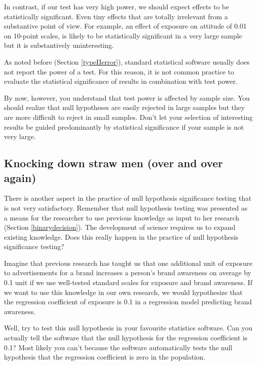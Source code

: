 \documentclass[a4paper]{book}
\theoremstyle{definition}
\theoremstyle{definition}
\theoremstyle{definition}
\theoremstyle{remark}
\begin{document}
In contrast, if our test has very high power, we should expect effects
to be statistically significant. Even tiny effects that are totally
irrelevant from a substantive point of view. For example, an effect of
exposure on attitude of 0.01 on 10-point scales, is likely to be
statistically significant in a very large sample but it is substantively
uninteresting.

As noted before (Section \ref{typeIIerror}), standard statistical
software usually does not report the power of a test. For this reason,
it is not common practice to evaluate the statistical significance of
results in combination with test power.

By now, however, you understand that test power is affected by sample
size. You should realize that null hypotheses are easily rejected in
large samples but they are more difficult to reject in small samples.
Don't let your selection of interesting results be guided predominantly
by statistical significance if your sample is not very large.

\subsection{Knocking down straw men (over and over
again)}\label{strawmen}

There is another aspect in the practice of null hypothesis significance
testing that is not very satisfactory. Remember that null hypothesis
testing was presented as a means for the researcher to use previous
knowledge as input to her research (Section \ref{binarydecision}). The
development of science requires us to expand existing knowledge. Does
this really happen in the practice of null hypothesis significance
testing?

Imagine that previous research has taught us that one additional unit of
exposure to advertisements for a brand increases a person's brand
awareness on average by 0.1 unit if we use well-tested standard scales
for exposure and brand awareness. If we want to use this knowledge in
our own research, we would hypothesize that the regression coefficient
of exposure is 0.1 in a regression model predicting brand awareness.

Well, try to test this null hypothesis in your favourite statistics
software. Can you actually tell the software that the null hypothesis
for the regression coefficient is 0.1? Most likely you can't because the
software automatically tests the null hypothesis that the regression
coefficient is zero in the population.
\end{document}
